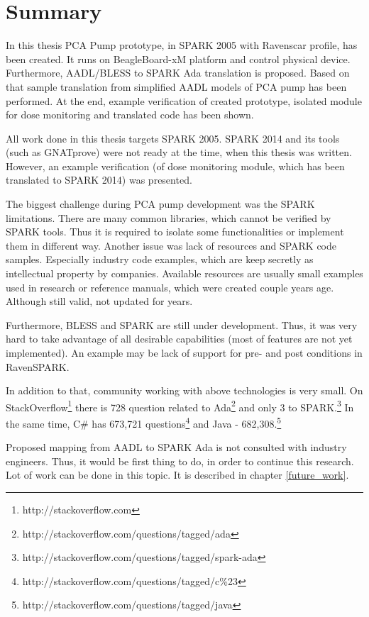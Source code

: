 
\cleardoublepage

\chapter{Summary}
\label{summary}

In this thesis PCA Pump prototype, in SPARK 2005 with Ravenscar profile, has been created. It runs on BeagleBoard-xM platform and control physical device. Furthermore, AADL/BLESS to SPARK Ada translation is proposed. Based on that sample translation from simplified AADL models of PCA pump has been performed. At the end, example verification of created prototype, isolated module for dose monitoring and translated code has been shown. 

All work done in this thesis targets SPARK 2005. SPARK 2014 and its tools (such as GNATprove) were not ready at the time, when this thesis was written. However, an example verification (of dose monitoring module, which has been translated to SPARK 2014) was presented.

The biggest challenge during PCA pump development was the SPARK limitations. There are many common libraries, which cannot be verified by SPARK tools. Thus it is required to isolate some functionalities or implement them in different way. Another issue was lack of resources and SPARK code samples. Especially industry code examples, which are keep secretly as intellectual property by companies. Available resources are usually small examples used in research or reference manuals, which were created couple years age. Although still valid, not updated for years.

Furthermore, BLESS and SPARK are still under development. Thus, it was very hard to take advantage of all desirable capabilities (most of features are not yet implemented). An example may be lack of support for pre- and post conditions in RavenSPARK.

In addition to that, community working with above technologies is very small. On StackOverflow\footnote{http://stackoverflow.com} there is 728 question related to Ada\footnote{http://stackoverflow.com/questions/tagged/ada} and only 3 to SPARK.\footnote{http://stackoverflow.com/questions/tagged/spark-ada} In the same time, C\# has 673,721 questions\footnote{http://stackoverflow.com/questions/tagged/c\%23} and Java - 682,308.\footnote{http://stackoverflow.com/questions/tagged/java}

Proposed mapping from AADL to SPARK Ada is not consulted with industry engineers. Thus, it would be first thing to do, in order to continue this research. Lot of work can be done in this topic. It is described in chapter \ref{future_work}.